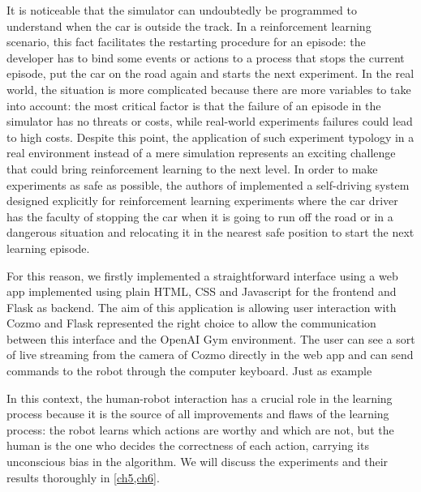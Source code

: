 It is noticeable that the simulator can undoubtedly be programmed to understand when the car is outside the track. In a reinforcement learning scenario, this fact facilitates the restarting procedure for an episode: the developer has to bind some events or actions to a process that stops the current episode, put the car on the road again and starts the next experiment. In the real world, the situation is more complicated because there are more variables to take into account: the most critical factor is that the failure of an episode in the simulator has no threats or costs, while real-world experiments failures could lead to high costs. Despite this point, the application of such experiment typology in a real environment instead of a mere simulation represents an exciting challenge that could bring reinforcement learning to the next level. In order to make experiments as safe as possible, the authors of \cite{kendall2018learning,kendall2019learning} implemented a self-driving system designed explicitly for reinforcement learning experiments where the car driver has the faculty of stopping the car when it is going to run off the road or in a dangerous situation and relocating it in the nearest safe position to start the next learning episode.

For this reason, we firstly implemented a straightforward interface using a web app implemented using plain HTML, CSS and Javascript for the frontend and Flask as backend. The aim of this application is allowing user interaction with Cozmo and Flask represented the right choice to allow the communication between this interface and the OpenAI Gym environment. The user can see a sort of live streaming from the camera of Cozmo directly in the web app and can send commands to the robot through the computer keyboard. Just as example

In this context, the human-robot interaction has a crucial role in the learning process because it is the source of all improvements and flaws of the learning process: the robot learns which actions are worthy and which are not, but the human is the one who decides the correctness of each action, carrying its unconscious bias in the algorithm. We will discuss the experiments and their results thoroughly in \vref{ch5,ch6}.




